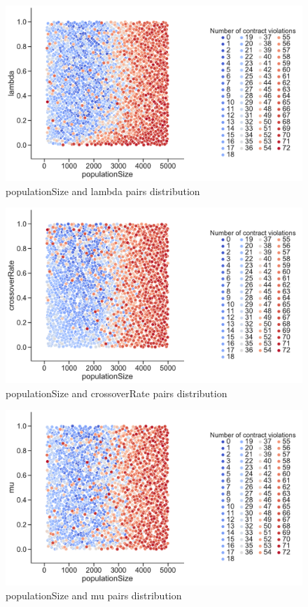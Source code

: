 \begin{figure}
	\centering
	\includegraphics[width=\textwidth]{images/PairsDistr/populationSize_lambda.pdf}
	\caption[populationSize and lambda pairs distribution]{populationSize and lambda pairs distribution}
	\label{fig:populationSize_lambda_pair}
\end{figure}
\begin{figure}
	\centering
	\includegraphics[width=\textwidth]{images/PairsDistr/populationSize_crossoverRate.pdf}
	\caption[populationSize and crossoverRate pairs distribution]{populationSize and crossoverRate pairs distribution}
	\label{fig:populationSize_crossoverRate_pair}
\end{figure}
\begin{figure}
	\centering
	\includegraphics[width=\textwidth]{images/PairsDistr/populationSize_mu.pdf}
	\caption[populationSize and mu pairs distribution]{populationSize and mu pairs distribution}
	\label{fig:populationSize_mu_pair}
\end{figure}
